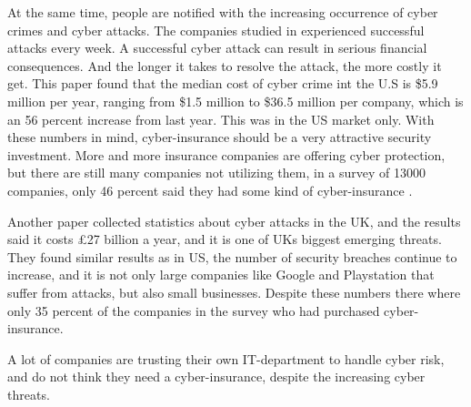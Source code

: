 At the same time, people are notified with the increasing occurrence of cyber crimes and cyber attacks.
The companies studied in \cite{ccost} experienced successful attacks every week.
 A successful cyber attack can result in serious financial consequences. 
 And the longer it takes to resolve the attack, the more costly it get. 
 This paper found that the median cost of cyber crime int the U.S is \$5.9 million per year, 
 ranging from \$1.5 million to \$36.5 million per company, 
 which is an 56 percent increase from last year. This was in the US market only. 
 With these numbers in mind, cyber-insurance should be a very attractive security investment. 
 More and more insurance companies are offering cyber protection,
  but there are still many companies not utilizing them, in a survey of 13000 companies, 
  only 46 percent said they had some kind of cyber-insurance \cite{compworld}. 

Another paper \cite{evolvingcyber} collected statistics about cyber attacks in the UK, and the results said it costs \pounds 27
 billion a year, and it is one of UKs biggest emerging threats. They found similar results as in US,
  the number of security breaches continue to increase, and it is not only large companies like Google
   and Playstation that suffer from attacks, but also small businesses. Despite these numbers
    there where only 35 percent of the companies in the survey who had purchased cyber-insurance. 

A lot of companies are trusting their own IT-department to handle cyber risk, 
and do not think they need a cyber-insurance, despite the increasing cyber threats. \cite{twatson}


